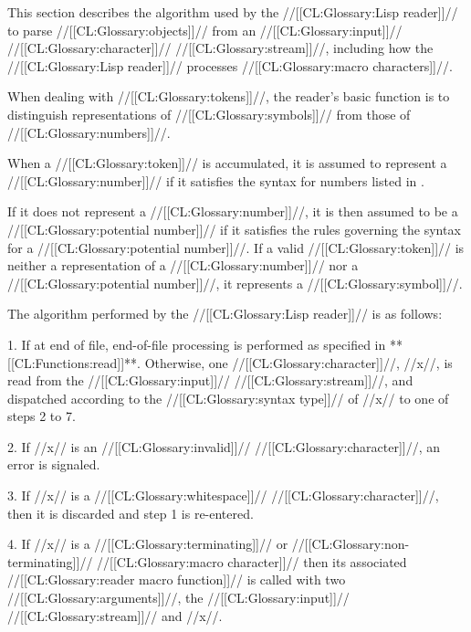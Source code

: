 



This section describes the algorithm used by the //[[CL:Glossary:Lisp reader]]//
to parse //[[CL:Glossary:objects]]// from an //[[CL:Glossary:input]]// //[[CL:Glossary:character]]// //[[CL:Glossary:stream]]//,
including how the //[[CL:Glossary:Lisp reader]]// processes //[[CL:Glossary:macro characters]]//.

When dealing with //[[CL:Glossary:tokens]]//, the reader's basic function is to distinguish
representations of //[[CL:Glossary:symbols]]// from those of //[[CL:Glossary:numbers]]//.




When a //[[CL:Glossary:token]]// is accumulated, it is assumed to represent a //[[CL:Glossary:number]]// if it
satisfies the syntax for numbers listed in \figref\SyntaxForNumericTokens.




If it does not represent a //[[CL:Glossary:number]]//,
it is then assumed to be a //[[CL:Glossary:potential number]]// 
if it satisfies the rules governing the syntax for a //[[CL:Glossary:potential number]]//.
If a valid //[[CL:Glossary:token]]// is neither a representation of a //[[CL:Glossary:number]]// 
			       nor a //[[CL:Glossary:potential number]]//,
it represents a //[[CL:Glossary:symbol]]//.

The algorithm performed by the //[[CL:Glossary:Lisp reader]]// is as follows:


\beginlist
\item{1.}            
If at end of file, end-of-file processing is performed as specified
in **[[CL:Functions:read]]**.
Otherwise,
one //[[CL:Glossary:character]]//, //x//,  is read from the //[[CL:Glossary:input]]// //[[CL:Glossary:stream]]//, and
dispatched according to the //[[CL:Glossary:syntax type]]// of //x// to one
of steps 2 to 7.


\item{2.}                                          
If //x// is an //[[CL:Glossary:invalid]]// //[[CL:Glossary:character]]//,
an error  is signaled.


\item{3.}
If //x// is a //[[CL:Glossary:whitespace]]// //[[CL:Glossary:character]]//,
then it is discarded and step 1 is re-entered.


\item{4.}
If //x// is a //[[CL:Glossary:terminating]]// or //[[CL:Glossary:non-terminating]]// //[[CL:Glossary:macro character]]//
then its associated //[[CL:Glossary:reader macro function]]// is called with two //[[CL:Glossary:arguments]]//,
the //[[CL:Glossary:input]]// //[[CL:Glossary:stream]]// and //x//.


